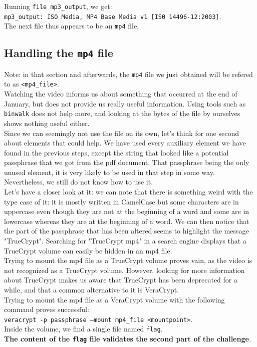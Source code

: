 \documentclass[12pt,a4paper]{article}
\begin{document}
    Running \texttt{file mp3\_output}, we get:\\
    \texttt{mp3\_output: ISO Media, MP4 Base Media v1 [IS0 14496-12:2003]}.\\
    The next file thus appears to be an \texttt{mp4} file.


    \subsection{Handling the \texttt{mp4} file}
    Note: in that section and afterwards, the \texttt{mp4} file we just
    obtained will be refered to as \texttt{<mp4\_file>}.\\

    Watching the video informs us about something that occurred at the end of January, but does not provide us really useful information. Using tools such as \texttt{binwalk} does not help more, and looking at the bytes of the file by ourselves shows nothing useful either.\\

    Since we can seemingly not use the file on its own, let's think for one
    second about elements that could help. We have used every auxiliary element
    we have found in the previous steps, except the string that looked like a
    potential passphrase that we got from the pdf document. That passphrase
    being the only unused element, it is very likely to be used in that step in
    some way. Nevertheless, we still do not know how to use it.\\

    Let's have a closer look at it: we can note that there is something weird
    with the type case of it: it is mostly written in CamelCase but some
    characters are in uppercase even though they are not at the beginning of a
    word and some are in lowercase whereas they are at the beginning of a word.
    We can then notice that the part of the passphrase that has been altered
    seems to highlight the message "TrueCrypt". Searching for "TrueCrypt mp4"
    in a search engine displays that a TrueCrypt volume can easily be hidden in
    an mp4 file.\\

    Trying to mount the mp4 file as a TrueCrypt volume proves vain, as the
    video is not recognized as a TrueCrypt volume. However, looking for more
    information about TrueCrypt makes us aware that TrueCrypt has been
    deprecated for a while, and that a common alternative to it is VeraCrypt.\\

    Trying to mount the mp4 file as a VeraCrypt volume with the following
    command proves successful:\\
    \texttt{veracrypt -p passphrase --mount mp4\_file <mountpoint>}.\\
    Inside the volume, we find a single file named \texttt{flag}.\\

    \textbf{The content of the \texttt{flag} file validates the second part of the challenge}.
\end{document}
